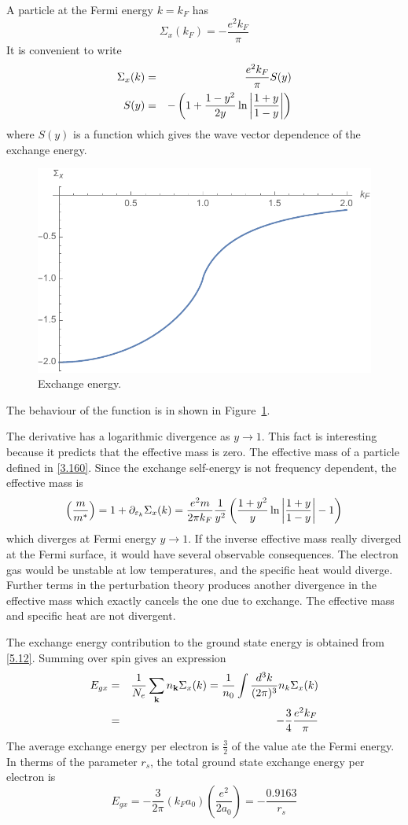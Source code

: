A particle at the Fermi energy $k=k_F$ has
\begin{equation}
    \Sigma_x (k_F) = - \frac{e^2 k_F}{\pi} \label{5.18}
\end{equation}
It is convenient to write
\begin{eqnarray}
    \Sigma_x(k) &=& \frac{e^2 k_F}{\pi} S(y)    \label{5.19} \\
    S(y) &=& - \left( 1+ \frac{1-y^2}{2y} \ln \abs{ \frac{1+y}{1-y} } \right)   \label{5.20}
\end{eqnarray}
where $S(y)$ is a function which gives the wave vector dependence of the exchange energy.
\begin{figure}[ht]
    \centering
    \includegraphics[width=0.4\linewidth]{./fig/fig5_1.pdf}
    \caption{Exchange energy.}%
    \label{fig:5.1}
\end{figure}
The behaviour of the function is in shown in Figure~\ref{fig:5.1}.

The derivative has a logarithmic divergence as $y\to 1$. This fact is interesting because it predicts that the effective mass is zero.
The effective mass of a particle defined in \eqref{3.160}.
Since the exchange self-energy is not frequency dependent, the effective mass is
\begin{equation}
    \left( \frac{m}{m^*} \right) = 1+ \partial_{\varepsilon_k} \Sigma_x(k) = \frac{e^2 m}{2\pi k_F } \frac{1}{y^2} \left( \frac{1+y^2}{y} \ln \abs{ \frac{1+y}{1-y} }-1  \right) \label{5.24}
\end{equation}
which diverges at Fermi energy $y\to 1$.
If the inverse effective mass really diverged at the Fermi surface, it would have several observable consequences.
The electron gas would be unstable at low temperatures, and the specific heat would diverge.
Further terms in the perturbation theory produces another divergence in the effective mass which exactly cancels the one due to exchange.
The effective mass and specific heat are not divergent.

The exchange energy contribution to the ground state energy is obtained from \eqref{5.12}.
Summing over spin gives an expression
\begin{eqnarray}
    E_{gx} &=& \frac{1}{N_e} \sum_{\mathbf{k}} n_{\mathbf{k}} \Sigma_x(k) = \frac{1}{n_0} \int \frac{d^3k}{(2\pi)^3} n_k \Sigma_x(k) \nonumber \\
    &=& - \frac{3}{4} \frac{e^2 k_F}{\pi} \label{5.25}
\end{eqnarray}
The average exchange energy per electron is $ \frac{3}{2} $ of the value ate the Fermi energy.
In therms of the parameter $r_s$, the total ground state exchange energy per electron is
\begin{equation}
    E_{gx} = - \frac{3}{2\pi} (k_F a_0) \left( \frac{e^2}{2a_0} \right) = - \frac{0.9163}{r_s} \label{5.26}
\end{equation}

